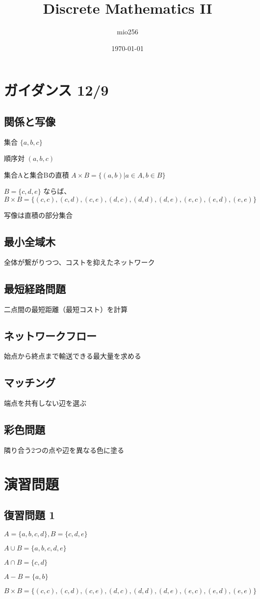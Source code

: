 \documentclass[a4paper,11pt]{jsarticle}
\begin{document}
\title{Discrete Mathematics II}
\author{mio256}
\date{\today}
\maketitle


\section{ガイダンス 12/9}

\subsection{関係と写像}

集合
$\{a,b,c\}$

順序対
$(a,b,c)$

集合Aと集合Bの直積
$A\times B=\{(a,b)|a\in A,b\in B\}$

$B=\{c,d,e\}$
ならば、
$B\times B=\{(c,c),(c,d),(c,e),
             (d,c),(d,d),(d,e),
             (e,c),(e,d),(e,e)\}$

写像は直積の部分集合

\subsection{最小全域木}

全体が繋がりつつ、コストを抑えたネットワーク

\subsection{最短経路問題}

二点間の最短距離（最短コスト）を計算

\subsection{ネットワークフロー}

始点から終点まで輸送できる最大量を求める

\subsection{マッチング}

端点を共有しない辺を選ぶ

\subsection{彩色問題}

隣り合う2つの点や辺を異なる色に塗る

\section{演習問題}

\subsection{復習問題 1}

$A=\{a,b,c,d\}, B=\{c,d,e\}$

$A\cup B=\{a,b,c,d,e\}$

$A\cap B=\{c,d\}$

$A-B=\{a,b\}$

$B\times B=\{(c,c),(c,d),(c,e),
             (d,c),(d,d),(d,e),
             (e,c),(e,d),(e,e)\}$

\subsection{}
\end{document}
